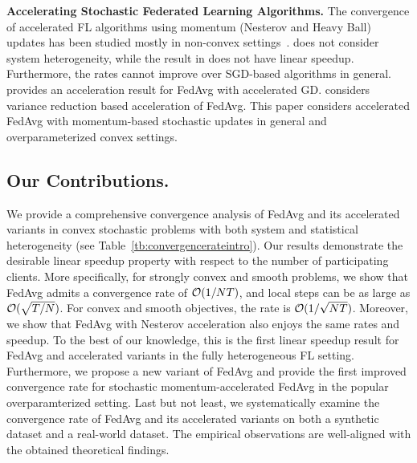 \textbf{Accelerating Stochastic Federated Learning Algorithms.}
The convergence of accelerated FL algorithms using momentum (Nesterov and Heavy Ball) updates has been studied mostly in non-convex settings~\cite{yu2019linear,huo2020faster}. \cite{yu2019linear} does not consider system heterogeneity, while the result in \cite{huo2020faster} does not have linear speedup. Furthermore, the rates cannot improve over SGD-based algorithms in general. \cite{liu2019accelerating} provides an acceleration result for FedAvg with accelerated GD. \cite{liang2019variance} considers variance reduction based acceleration of FedAvg. This paper considers accelerated FedAvg with momentum-based stochastic updates in general and overparameterized convex settings.

\begin{comment}
	In this work, we provide a novel accelerated FedAvg with improved convergence rates under a popular overparameterized setting. 
\end{comment}




\subsection{Our Contributions.}
We provide a comprehensive convergence analysis
of FedAvg and its accelerated variants in convex stochastic problems with both system and statistical heterogeneity (see Table~\ref{tb:convergencerateintro}).
Our results demonstrate the desirable linear speedup property with respect to the number of participating clients.
More specifically, for strongly convex and smooth problems, we show 
that FedAvg admits a convergence rate of 
{\small{${\mathcal{O}}(1/NT)$}}, and local steps can be as large as {\small{${\mathcal{O}}(\sqrt{T/N})$}}. For convex and smooth objectives, the rate is {\small{${\mathcal{O}}(1/\sqrt{NT})$}}. 
Moreover, we show that FedAvg with Nesterov acceleration also enjoys the same rates and speedup. 
To the best of our knowledge, this is the first linear speedup result for FedAvg and accelerated variants in the fully heterogeneous FL setting. Furthermore, 
we propose a new variant of FedAvg and provide the first improved convergence rate for stochastic momentum-accelerated FedAvg in the popular overparamterized setting.
Last but not least, we systematically examine the convergence rate of
FedAvg and its accelerated variants on both a synthetic dataset and  a real-world dataset. The empirical observations are well-aligned with the obtained theoretical findings.


